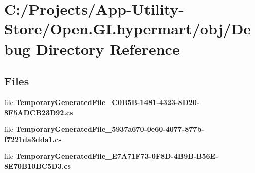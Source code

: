 \section{C\+:/\+Projects/\+App-\/\+Utility-\/\+Store/\+Open.G\+I.\+hypermart/obj/\+Debug Directory Reference}
\label{dir_c57577b0f8838942aea8be9fdbc2d132}
\subsection*{Files}
\begin{DoxyCompactItemize}
\item 
file \textbf{ Temporary\+Generated\+File\+\_\+C0\+B5\+B-\/1481-\/4323-\/8\+D20-\/8\+F5\+A\+D\+C\+B23\+D92.\+cs}
\item 
file \textbf{ Temporary\+Generated\+File\+\_\+5937a670-\/0e60-\/4077-\/877b-\/f7221da3dda1.\+cs}
\item 
file \textbf{ Temporary\+Generated\+File\+\_\+\+E7\+A71\+F73-\/0\+F8\+D-\/4\+B9\+B-\/\+B56\+E-\/8\+E70\+B10\+B\+C5\+D3.\+cs}
\end{DoxyCompactItemize}
